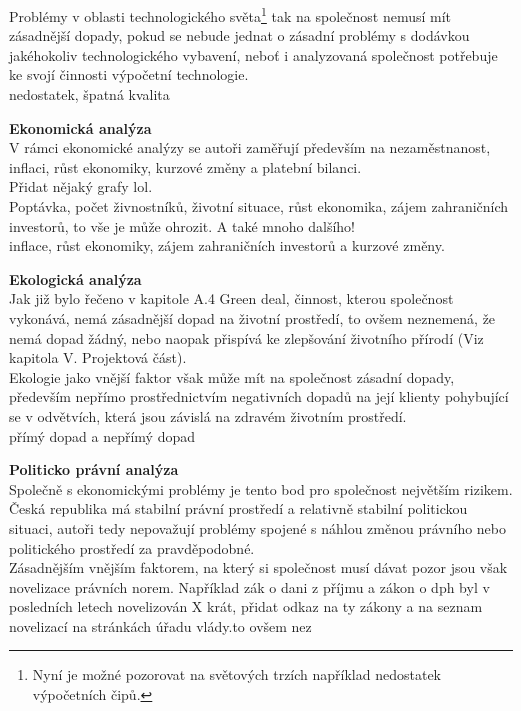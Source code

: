 Problémy v oblasti technologického světa\footnote{Nyní je možné pozorovat na světových trzích například nedostatek výpočetních čipů.} tak na společnost nemusí mít zásadnější dopady, pokud se nebude jednat o zásadní problémy s dodávkou jakéhokoliv technologického vybavení, neboť i analyzovaná společnost potřebuje ke svojí činnosti výpočetní technologie.\\

nedostatek, špatná kvalita

\textbf{Ekonomická analýza}\\

V rámci ekonomické analýzy se autoři zaměřují především na nezaměstnanost, inflaci, růst ekonomiky, kurzové změny a platební bilanci.\\

Přidat nějaký grafy lol.\\

Poptávka, počet živnostníků, životní situace, růst ekonomika, zájem zahraničních investorů, to vše je může ohrozit. A také mnoho dalšího!\\

inflace, růst ekonomiky, zájem zahraničních investorů a kurzové změny.

\textbf{Ekologická analýza}\\

Jak již bylo řečeno v kapitole A.4 Green deal, činnost, kterou společnost vykonává, nemá zásadnější dopad na životní prostředí, to ovšem neznemená, že nemá dopad žádný, nebo naopak přispívá ke zlepšování životního přírodí (Viz kapitola V. Projektová část).\\

Ekologie jako vnější faktor však může mít na společnost zásadní dopady, především nepřímo prostřednictvím negativních dopadů na její klienty pohybující se v odvětvích, která jsou závislá na zdravém životním prostředí.\\

přímý dopad a nepřímý dopad

\textbf{Politicko právní analýza}\\

Společně s ekonomickými problémy je tento bod pro společnost největším rizikem. Česká republika má stabilní právní prostředí a relativně stabilní politickou situaci, autoři tedy nepovažují problémy spojené s náhlou změnou právního nebo politického prostředí za pravděpodobné.\\

Zásadnějším vnějším faktorem, na který si společnost musí dávat pozor jsou však novelizace právních norem. Například zák o dani z příjmu a zákon o dph byl v posledních letech novelizován X krát, přidat odkaz na ty zákony a na seznam novelizací na stránkách úřadu vlády.to ovšem nez\\


